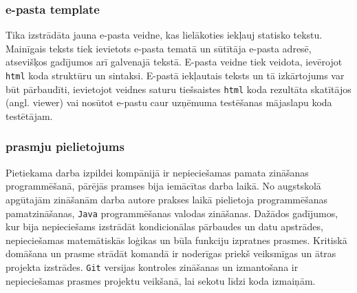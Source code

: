 \subsubsection{e-pasta template}
\par Tika izstrādāta jauna e-pasta veidne, kas lielākoties iekļauj statisko tekstu. Mainīgais teksts tiek ievietots e-pasta tematā un sūtītāja e-pasta adresē, atsevišķos gadījumos arī galvenajā tekstā. E-pasta veidne tiek veidota, ievērojot \texttt{html} koda struktūru un sintaksi. E-pastā iekļautais teksts un tā izkārtojums var būt pārbaudīti, ievietojot veidnes saturu tiešsaistes \texttt{html} koda rezultāta skatītājos (angl. viewer) vai nosūtot e-pastu caur uzņēmuma testēšanas mājaslapu koda testētājam.
\subsubsection{prasmju pielietojums}
\par Pietiekama darba izpildei kompānijā ir nepieciešamas pamata zināšanas programmēšanā, pārējās pramses bija iemācītas darba laikā. No augstskolā apgūtajām zināšanām darba autore prakses laikā pielietoja programmēšanas pamatzināšanas, \texttt{Java} programmēšanas valodas zināšanas. Dažādos gadījumos, kur bija nepieciešams izstrādāt kondicionālas pārbaudes un datu apstrādes, nepieciešamas matemātiskās loģikas un būla funkciju izpratnes prasmes. Kritiskā domāšana un prasme strādāt komandā ir noderīgas priekš veiksmīgas un ātras projekta izstrādes. \texttt{Git} versijas kontroles zināšanas un izmantošana ir nepieciešamas prasmes projektu veikšanā, lai sekotu līdzi koda izmaiņām.



